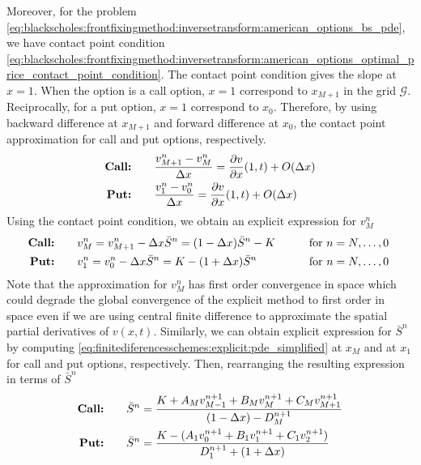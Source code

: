Moreover, for the problem \eqref{eq:blackscholes:frontfixingmethod:inversetransform:american_options_bs_pde}, we have contact point condition \eqref{eq:blackscholes:frontfixingmethod:inversetransform:american_options_optimal_price_contact_point_condition}. The contact point condition gives the slope at $x=1$. When the option is a call option, $x=1$ correspond to $x_{M+1}$ in the grid $\mathcal{G}$. Reciprocally, for a put option, $x=1$ correspond to $x_0$. Therefore, by using backward difference at $x_{M+1}$ and forward difference at $x_0$, the contact point approximation for call and put options, respectively.
\begin{align*}
  \text{\textbf{Call:}} \qquad & \dfrac{v^{n}_{M+1} - v^{n}_{M}}{\Delta{x}} = \dfrac{\partial{v}}{\partial{x}}(1, t) + O(\Delta{x}) \\
  \text{\textbf{Put:}} \qquad & \dfrac{v^{n}_{1} - v^{n}_{0}}{\Delta{x}} = \dfrac{\partial{v}}{\partial{x}}(1, t)+ O(\Delta{x}) 
\end{align*}
Using the contact point condition, we obtain an explicit expression for $v^{n}_{M}$
\begin{subequations}
  \label{eq:finitediferencesschemes:explicit:contact_point_approximation_2}
  \begin{align}
    \text{\textbf{Call:}} \qquad& v^{n}_{M} = v^{n}_{M+1} - \Delta{x}\bar{S}^{n} = (1-\Delta{x})\bar{S}^n - K & \qquad \text{for $n = N,\dots,0$ }\\
    \text{\textbf{Put:}} \qquad& v^{n}_{1} = v^{n}_{0} - \Delta{x}\bar{S}^{n} = K - (1+\Delta{x})\bar{S}^n & \qquad \text{for $n = N,\dots,0$ }
  \end{align}    
\end{subequations}
Note that the approximation for $v^{n}_{M}$ has first order convergence in space which could degrade the global convergence of the explicit method to first order in space even if we are using central finite difference to approximate the spatial partial derivatives of $v(x,t)$. Similarly, we can obtain explicit expression for $\bar{S}^{n}$ by computing \eqref{eq:finitediferencesschemes:explicit:pde_simplified} at $x_M$ and at $x_1$ for call and put options, respectively. Then, rearranging the resulting expression in terms of $\bar{S}^n$ 
\begin{subequations}
  \label{eq:finitediferencesschemes:explicit:optimal_exercise_price_approximation}
  \begin{align}
    \text{\textbf{Call:}} \qquad& \bar{S}^{n} = \dfrac{K + A_{M}v^{n+1}_{M-1} + B_{M}v^{n+1}_{M} + C_{M}v^{n+1}_{M+1}}{(1-\Delta{x}) - D^{n+1}_{M}} \\
    \text{\textbf{Put:}} \qquad& \bar{S}^{n} = \dfrac{K - (A_{1}v^{n+1}_{0} + B_{1}v^{n+1}_{1} + C_{1}v^{n+1}_{2})}{D^{n+1}_1 + (1+\Delta{x})}
  \end{align}
\end{subequations}
